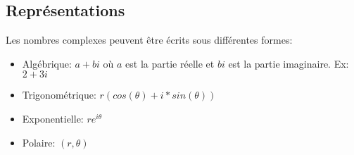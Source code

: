 \subsection{Représentations}

Les nombres complexes peuvent être écrits sous différentes formes:
\begin{itemize}
    \item Algébrique: $a + bi$ où $a$ est la partie réelle et $bi$ est la partie imaginaire. Ex: $2 + 3i$
    \item Trigonométrique: $r(cos(\theta) + i*sin(\theta))$
    \item Exponentielle: $re^{i\theta}$
    \item Polaire: $(r, \theta)$
\end{itemize}